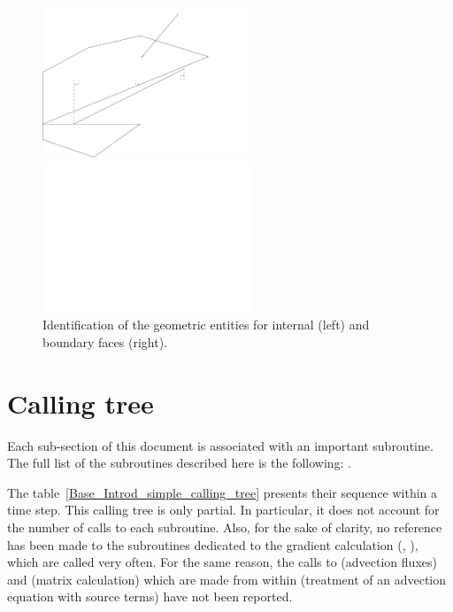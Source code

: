 \begin{figure}[t]
\parbox{8cm}{\centerline{\includegraphics[height=4.5cm]{../Base/Introd/Images/facette.pdf}}}
\parbox{8cm}{\centerline{%
\includegraphics[height=4.5cm]{../Base/Introd/Images/facebord.pdf}}}
\caption{Identification of the geometric entities for internal (left) and
boundary faces (right).}
\label{Base_Introd_fig_geom}
\end{figure}

\clearpage %

\section{Calling tree}

%
Each sub-section of this document is associated with an important
subroutine. The full list of the subroutines described here is the
following:     %
.

The table~\ref{Base_Introd_simple_calling_tree} presents their sequence within a time
step. This calling tree is only partial. In particular, it does not account
for the number of calls to each subroutine. Also, for the sake of clarity,
no reference has been made to the subroutines dedicated to the gradient
calculation (, ), which are called very often. For
the same reason, the calls to  (advection fluxes) and %
 (matrix calculation) which are made from within 
(treatment of an advection equation with source terms) have not been
reported.

